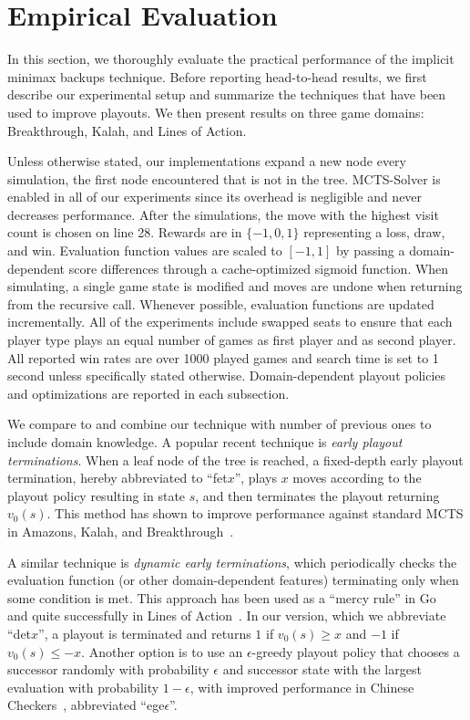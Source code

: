 \documentclass[conference]{IEEEtran}
\begin{document}
\section{Empirical Evaluation}

\newcommand{\UCTMAXH}{$\mbox{UCTMAX}_H$\xspace}
\newcommand{\UCTH}{$\mbox{UCT}_H$\xspace}

In this section, we thoroughly evaluate the practical performance of the implicit minimax backups technique. 
Before reporting head-to-head results, we first describe our experimental setup and 
summarize the techniques that have been used to improve playouts. We then present results on three game
domains: Breakthrough, Kalah, and Lines of Action. 

Unless otherwise stated, our implementations expand a new node every simulation, the first node encountered
that is not in the tree. MCTS-Solver is enabled in all of our experiments since its overhead is negligible and
never decreases performance. After the simulations, the move with the highest visit count 
is chosen on line 28. 
Rewards are in $\{-1, 0, 1\}$ representing a loss, draw, and win.
Evaluation function values are scaled to $[-1,1]$ by passing a domain-dependent 
score differences through a cache-optimized sigmoid function. 
When simulating, a single game state is modified and 
moves are undone when returning from the recursive call.
Whenever possible, evaluation functions are updated incrementally. 
All of the experiments include swapped seats to ensure that each player type plays 
an equal number of games as first player and as second player.
All reported win rates are over 1000 played games and search time is set to 1 second unless specifically stated 
otherwise.
Domain-dependent playout policies and optimizations are reported in each subsection.

We compare to and combine our technique with number of previous ones to include  
domain knowledge. A popular recent technique is {\it early playout terminations}. When a leaf node of the tree 
is reached, a fixed-depth early playout termination, hereby abbreviated to ``fet$x$'', plays $x$ moves according
to the playout policy resulting in state $s$, and then terminates the playout returning $v_0(s)$. This method has
shown to improve performance against standard MCTS in Amazons, Kalah, and 
Breakthrough~\cite{Lorentz13Breakthrough,Ramanujan11Tradeoffs,Lorentz08Amazons}. 

A similar technique is {\it dynamic early terminations}, which periodically checks the evaluation function 
(or other domain-dependent features) terminating only when some condition is met. 
This approach has been used as a ``mercy rule'' in Go~\cite{Bouzy07Old} and quite successfully in 
Lines of Action~\cite{Winands08MCTSSolver}.
In our version, which we abbreviate ``det$x$'', a playout is terminated and returns $1$ if $v_0(s) \ge x$ and 
$-1$ if $v_0(s) \le -x$. Another option is to use an $\epsilon$-greedy playout policy that chooses a successor randomly 
with probability $\epsilon$ and successor state with the largest evaluation with probability $1-\epsilon$, with 
improved performance in Chinese Checkers~\cite{Sturtevant08An,Nijssen12Playout}, abbreviated ``ege$\epsilon$''.
\end{document}
